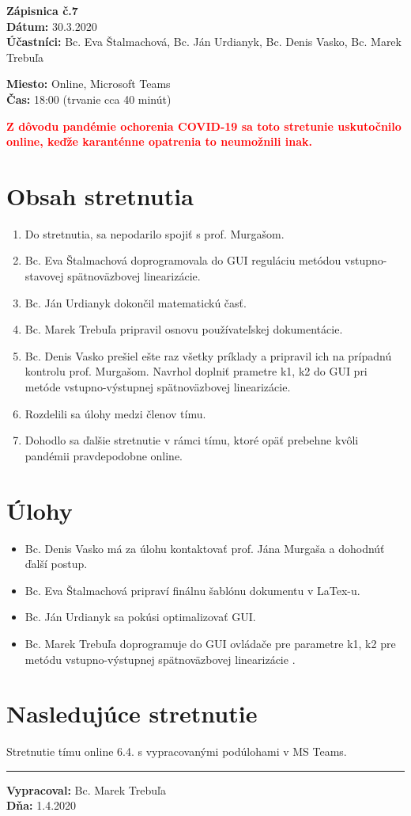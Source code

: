 
\usepackage{parskip}%
\usepackage[dvipsnames]{xcolor}

	\textbf{{\Huge Zápisnica č.7}}\\
			
	\textbf{Dátum:} 30.3.2020\\	
		
	\textbf{Účastníci:} Bc. Eva Štalmachová, Bc. Ján Urdianyk, Bc. Denis Vasko, Bc. Marek Trebuľa

	\textbf{Miesto:} Online, Microsoft Teams\\	
	
	\textbf{Čas:} 18:00 (trvanie cca 40 minút)
	
	\textbf{\textcolor{red}{Z dôvodu pandémie ochorenia COVID-19 sa toto stretunie uskutočnilo online, keďže karanténne opatrenia to neumožnili inak.}}   
    \section*{Obsah stretnutia}
    \begin{enumerate}
    	\item Do stretnutia, sa nepodarilo spojiť s prof. Murgašom. 
    	\item Bc. Eva Štalmachová doprogramovala  do GUI reguláciu metódou vstupno-stavovej spätnoväzbovej linearizácie.
    	\item Bc. Ján Urdianyk dokončil matematickú časť.
    	\item Bc. Marek Trebuľa pripravil osnovu používateľskej dokumentácie.
    	\item Bc. Denis Vasko prešiel ešte raz všetky príklady a pripravil ich na prípadnú kontrolu prof. Murgašom. Navrhol doplniť prametre k1, k2 do GUI pri metóde vstupno-výstupnej spätnoväzbovej linearizácie. 
    	\item Rozdelili sa úlohy medzi členov tímu.
    	\item Dohodlo sa ďalšie stretnutie v rámci tímu, ktoré opäť prebehne kvôli pandémii pravdepodobne online.
    \end{enumerate}    
    \section*{Úlohy}
    \begin{itemize}
    	\item Bc. Denis Vasko má za úlohu kontaktovať prof. Jána Murgaša a dohodnúť ďalší postup.
    	\item Bc. Eva Štalmachová pripraví finálnu šablónu dokumentu v LaTex-u.
    	\item Bc. Ján Urdianyk sa pokúsi optimalizovať GUI.
    	\item Bc. Marek Trebuľa doprogramuje do GUI ovládače pre parametre k1, k2 pre metódu vstupno-výstupnej spätnoväzbovej linearizácie . 
    \end{itemize}

    \section*{Nasledujúce stretnutie}
    
    Stretnutie tímu online 6.4. s vypracovanými podúlohami v MS Teams.

    
    \noindent\rule{15cm}{0.4pt}
   {\small 	\textbf{Vypracoval:} Bc. Marek Trebuľa\\
   \textbf{Dňa:} 1.4.2020 }
    

